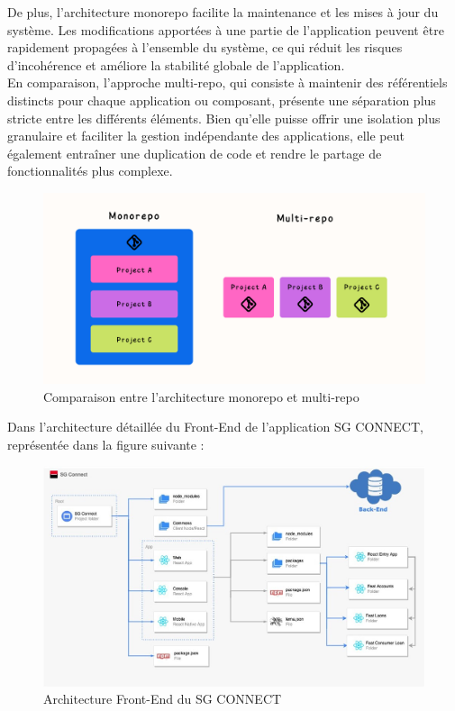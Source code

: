 De plus, l'architecture monorepo facilite la maintenance et les mises à jour du système. Les modifications apportées à une partie de l'application peuvent être rapidement propagées à l'ensemble du système, ce qui réduit les risques d'incohérence et améliore la stabilité globale de l'application.\\

En comparaison, l'approche multi-repo, qui consiste à maintenir des référentiels distincts pour chaque application ou composant, présente une séparation plus stricte entre les différents éléments. Bien qu'elle puisse offrir une isolation plus granulaire et faciliter la gestion indépendante des applications, elle peut également entraîner une duplication de code et rendre le partage de fonctionnalités plus complexe.

\begin{figure}[!h]
    \centering %
        \includegraphics[width=16cm]{images/conception/monoRepo.png}
    \caption{Comparaison entre l’architecture monorepo et multi-repo}
\end{figure}

Dans l'architecture détaillée du Front-End de l'application SG CONNECT, représentée dans la figure suivante :
\begin{figure}[!h]
    \centering %
        \includegraphics[width=14cm]{images/conception/architectureFRONT.jpg}
    \caption{Architecture Front-End du SG CONNECT}
\end{figure}

